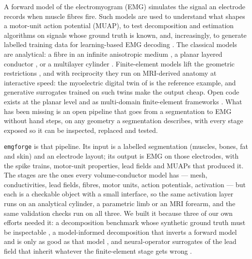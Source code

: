 \documentclass[11pt,a4paper]{article}
\newcommand{\emgforge}{\texttt{emgforge}}
\begin{document}
A forward model of the electromyogram (EMG) simulates the signal an electrode records
when muscle fibres fire. Such models are used to understand what shapes a motor-unit
action potential (MUAP), to test decomposition and estimation algorithms on signals whose
ground truth is known, and, increasingly, to generate labelled training data for
learning-based EMG decoding \citep{maksymenko2023myoelectric, ma2025conditional,
ma2024neuromotion}. The classical models are analytical: a fibre in an infinite
anisotropic medium \citep{rosenfalck1969intra, andreassen1981relationship,
nandedkar1983simulation}, a planar layered conductor \citep{farina1999compensation,
farina2001novel}, or a multilayer cylinder \citep{gootzen1991finite, blok2002three,
farina2004multilayer}. Finite-element models lift the geometric restrictions
\citep{lowery2002multiple, lowery2004volume, botelho2019anatomically}, and with
reciprocity they run on MRI-derived anatomy at interactive speed: the myoelectric digital
twin of \citet{maksymenko2023myoelectric} is the reference example, and generative
surrogates trained on such twins \citep{ma2025conditional, ma2024neuromotion} make the
output cheap. Open code exists at the planar level \citep{petersen2019comprehensive} and
as multi-domain finite-element frameworks \citep{klotz2020modelling}. What has been
missing is an open pipeline that goes from a segmentation to EMG without hand steps, on
any geometry a segmentation describes, with every stage exposed so it can be inspected,
replaced and tested.

\emgforge{} is that pipeline. Its input is a labelled segmentation (muscles, bones, fat
and skin) and an electrode layout; its output is EMG on those electrodes, with the
spike trains, motor-unit properties, lead fields and MUAPs that produced it. The stages
are the ones every volume-conductor model has --- mesh, conductivities, lead fields,
fibres, motor units, action potentials, activation --- but each is a checkable object with
a small interface, so the same activation layer runs on an analytical cylinder, a
parametric limb or an MRI forearm, and the same validation checks run on all three. We
built it because three of our own efforts needed it: a decomposition benchmark whose
synthetic ground truth must be inspectable \citep{mamidanna2025muniverse}, a
model-informed decomposition that inverts a forward model and is only as good as that
model \citep{halatsis2025bmiss}, and neural-operator surrogates of the lead field that
inherit whatever the finite-element stage gets wrong \citep{halatsis2024modelling,
halatsis2026neural}.
\end{document}
